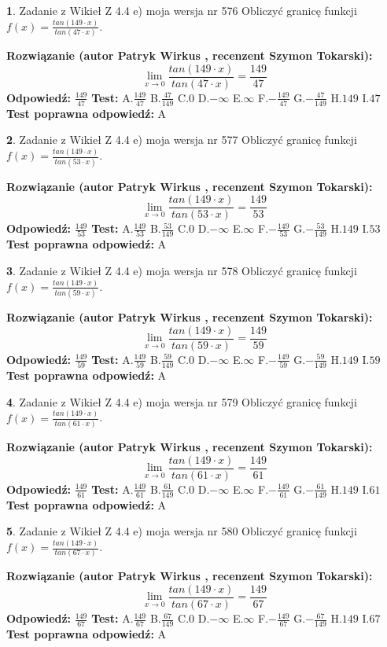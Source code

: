 \documentclass[12pt, a4paper]{article}
\theoremstyle{definition} %
\newtheorem{zad}{}
\newcommand{\zadStart}[1]{\begin{zad}#1\newline}
\newcommand{\zadStop}{\end{zad}}
\newcommand{\rozwStart}[2]{\noindent \textbf{Rozwiązanie (autor #1 , recenzent #2): }\newline}
\newcommand{\rozwStop}{\newline}
\newcommand{\odpStart}{\noindent \textbf{Odpowiedź:}\newline}
\newcommand{\odpStop}{\newline}
\newcommand{\testStart}{\noindent \textbf{Test:}\newline}
\newcommand{\testStop}{\newline}
\newcommand{\kluczStart}{\noindent \textbf{Test poprawna odpowiedź:}\newline}
\newcommand{\kluczStop}{\newline}
\begin{document}
\zadStart{Zadanie z Wikieł Z 4.4 e) moja wersja nr 576}
Obliczyć granicę funkcji $f(x)=\frac{tan(149\cdot x)}{tan(47\cdot x)}$.
\zadStop
\rozwStart{Patryk Wirkus}{Szymon Tokarski}
$$\lim\limits_{x\to 0}\frac{tan(149\cdot x)}{tan(47\cdot x)}=
\frac{149}{47}$$
\rozwStop
\odpStart
$\frac{149}{47}$
\odpStop
\testStart
A.$\frac{149}{47}$
B.$\frac{47}{149}$
C.$0$
D.$-\infty$
E.$\infty$
F.$-\frac{149}{47}$
G.$-\frac{47}{149}$
H.$149$
I.$47$
\testStop
\kluczStart
A
\kluczStop



\zadStart{Zadanie z Wikieł Z 4.4 e) moja wersja nr 577}
Obliczyć granicę funkcji $f(x)=\frac{tan(149\cdot x)}{tan(53\cdot x)}$.
\zadStop
\rozwStart{Patryk Wirkus}{Szymon Tokarski}
$$\lim\limits_{x\to 0}\frac{tan(149\cdot x)}{tan(53\cdot x)}=
\frac{149}{53}$$
\rozwStop
\odpStart
$\frac{149}{53}$
\odpStop
\testStart
A.$\frac{149}{53}$
B.$\frac{53}{149}$
C.$0$
D.$-\infty$
E.$\infty$
F.$-\frac{149}{53}$
G.$-\frac{53}{149}$
H.$149$
I.$53$
\testStop
\kluczStart
A
\kluczStop



\zadStart{Zadanie z Wikieł Z 4.4 e) moja wersja nr 578}
Obliczyć granicę funkcji $f(x)=\frac{tan(149\cdot x)}{tan(59\cdot x)}$.
\zadStop
\rozwStart{Patryk Wirkus}{Szymon Tokarski}
$$\lim\limits_{x\to 0}\frac{tan(149\cdot x)}{tan(59\cdot x)}=
\frac{149}{59}$$
\rozwStop
\odpStart
$\frac{149}{59}$
\odpStop
\testStart
A.$\frac{149}{59}$
B.$\frac{59}{149}$
C.$0$
D.$-\infty$
E.$\infty$
F.$-\frac{149}{59}$
G.$-\frac{59}{149}$
H.$149$
I.$59$
\testStop
\kluczStart
A
\kluczStop



\zadStart{Zadanie z Wikieł Z 4.4 e) moja wersja nr 579}
Obliczyć granicę funkcji $f(x)=\frac{tan(149\cdot x)}{tan(61\cdot x)}$.
\zadStop
\rozwStart{Patryk Wirkus}{Szymon Tokarski}
$$\lim\limits_{x\to 0}\frac{tan(149\cdot x)}{tan(61\cdot x)}=
\frac{149}{61}$$
\rozwStop
\odpStart
$\frac{149}{61}$
\odpStop
\testStart
A.$\frac{149}{61}$
B.$\frac{61}{149}$
C.$0$
D.$-\infty$
E.$\infty$
F.$-\frac{149}{61}$
G.$-\frac{61}{149}$
H.$149$
I.$61$
\testStop
\kluczStart
A
\kluczStop



\zadStart{Zadanie z Wikieł Z 4.4 e) moja wersja nr 580}
Obliczyć granicę funkcji $f(x)=\frac{tan(149\cdot x)}{tan(67\cdot x)}$.
\zadStop
\rozwStart{Patryk Wirkus}{Szymon Tokarski}
$$\lim\limits_{x\to 0}\frac{tan(149\cdot x)}{tan(67\cdot x)}=
\frac{149}{67}$$
\rozwStop
\odpStart
$\frac{149}{67}$
\odpStop
\testStart
A.$\frac{149}{67}$
B.$\frac{67}{149}$
C.$0$
D.$-\infty$
E.$\infty$
F.$-\frac{149}{67}$
G.$-\frac{67}{149}$
H.$149$
I.$67$
\testStop
\kluczStart
A
\kluczStop
\end{document}
